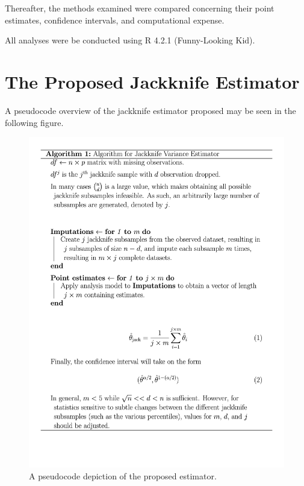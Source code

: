 \documentclass[
  letterpaper,
  DIV=11,
  numbers=noendperiod]{scrreprt}
\begin{document}
Thereafter, the methods examined were compared concerning their point
estimates, confidence intervals, and computational expense.

All analyses were be conducted using R 4.2.1 (Funny-Looking Kid).


\hypertarget{sec-est}{%
\chapter{The Proposed Jackknife Estimator}\label{sec-est}}

A pseudocode overview of the jackknife estimator proposed may be seen in
the following figure.

\begin{figure}

{\centering \includegraphics{./Algorithm_for_jackknife_estimator.jpg}

}

\caption{A pseudocode depiction of the proposed estimator.}

\end{figure}
\end{document}
